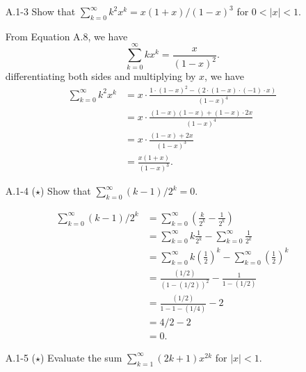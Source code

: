 \begin{enumerate}
\item[A.1{-}3] {Show that $\sum_{k = 0}^{\infty} k^2 x^k = x(1 + x)/(1 - x)^3$
for $0 < |x| < 1$.}

\begin{framed}
From Equation A.8, we have
\[
  \sum_{k = 0}^{\infty} k x^k = \frac{x}{(1 - x)^2}.
\]
differentiating both sides and multiplying by $x$, we have
\begin{equation*}
\begin{aligned}
  \sum_{k = 0}^{\infty} k^2 x^k &= x \cdot \frac{1 \cdot (1 - x)^2 - (2 \cdot (1 - x) \cdot (-1) \cdot x)}{(1 - x)^4}\\
                                &= x \cdot \frac{(1 - x)(1 - x) + (1 - x) \cdot 2x}{(1 - x)^4}\\
                                &= x \cdot \frac{(1 - x) + 2x}{(1 - x)^3}\\
                                &= \frac{x(1 + x)}{(1 - x)^3}.
\end{aligned}
\end{equation*}
\end{framed}

\newpage

\item[A.1{-}4] {($\star$) Show that $\sum_{k = 0}^{\infty} (k - 1)/2^k = 0$.}

\begin{framed}
\begin{equation*}
\begin{aligned}
  \sum_{k = 0}^{\infty} (k - 1)/2^k
  &= \sum_{k = 0}^{\infty} \left( \frac{k}{2^k} - \frac{1}{2^k} \right)\\
  &= \sum_{k = 0}^{\infty} k \frac{1}{2^k} - \sum_{k = 0}^{\infty} \frac{1}{2^k}\\
  &= \sum_{k = 0}^{\infty} k \left( \frac{1}{2} \right)^k - \sum_{k = 0}^{\infty} \left( \frac{1}{2} \right)^k\\
  &= \frac{(1/2)}{(1 - (1/2))^2} - \frac{1}{1 - (1/2)}\\
  &= \frac{(1/2)}{1 - 1 - (1/4)} - 2\\
  &= 4/2 - 2\\
  &= 0.
\end{aligned}
\end{equation*}
\end{framed}

\item[A.1{-}5] {($\star$) Evaluate the sum
$\sum_{k = 1}^{\infty} (2k + 1) x^{2k}$ for $|x| < 1$.}


\end{enumerate}
